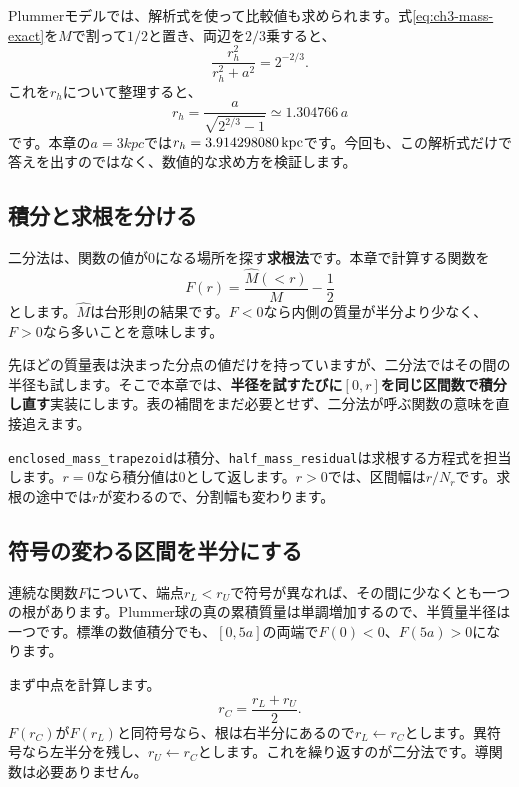 Plummerモデルでは、解析式を使って比較値も求められます。式\eqref{eq:ch3-mass-exact}を$M$で割って$1/2$と置き、両辺を$2/3$乗すると、
\[
 \frac{r_h^2}{r_h^2+a^2}=2^{-2/3}.
\]
これを$r_h$について整理すると、
\begin{equation}
 r_h=\frac{a}{\sqrt{2^{2/3}-1}}\simeq1.304766\,a
 \label{eq:ch3-half-exact}
\end{equation}
です。本章の$a=3\unit{kpc}$では$r_h=3.914298080\,\mathrm{kpc}$です。今回も、この解析式だけで答えを出すのではなく、数値的な求め方を検証します。

\subsection{積分と求根を分ける}
二分法は、関数の値が0になる場所を探す\textbf{求根法}です。本章で計算する関数を
\begin{equation}
 F(r)=\frac{\widehat M(<r)}{M}-\frac12
 \label{eq:ch3-root-function}
\end{equation}
とします。$\widehat M$は台形則の結果です。$F<0$なら内側の質量が半分より少なく、$F>0$なら多いことを意味します。

先ほどの質量表は決まった分点の値だけを持っていますが、二分法ではその間の半径も試します。そこで本章では、\textbf{半径を試すたびに$[0,r]$を同じ区間数で積分し直す}実装にします。表の補間をまだ必要とせず、二分法が呼ぶ関数の意味を直接追えます。

\texttt{enclosed\_mass\_trapezoid}は積分、\texttt{half\_mass\_residual}は求根する方程式を担当します。$r=0$なら積分値は0として返します。$r>0$では、区間幅は$r/N_r$です。求根の途中では$r$が変わるので、分割幅も変わります。

\subsection{符号の変わる区間を半分にする}
連続な関数$F$について、端点$r_L<r_U$で符号が異なれば、その間に少なくとも一つの根があります。Plummer球の真の累積質量は単調増加するので、半質量半径は一つです。標準の数値積分でも、$[0,5a]$の両端で$F(0)<0$、$F(5a)>0$になります。

まず中点を計算します。
\begin{equation}
 r_C=\frac{r_L+r_U}{2}.
 \label{eq:ch3-bisection}
\end{equation}
$F(r_C)$が$F(r_L)$と同符号なら、根は右半分にあるので$r_L\leftarrow r_C$とします。異符号なら左半分を残し、$r_U\leftarrow r_C$とします。これを繰り返すのが二分法です。導関数は必要ありません。\cite{sugiura2009}

